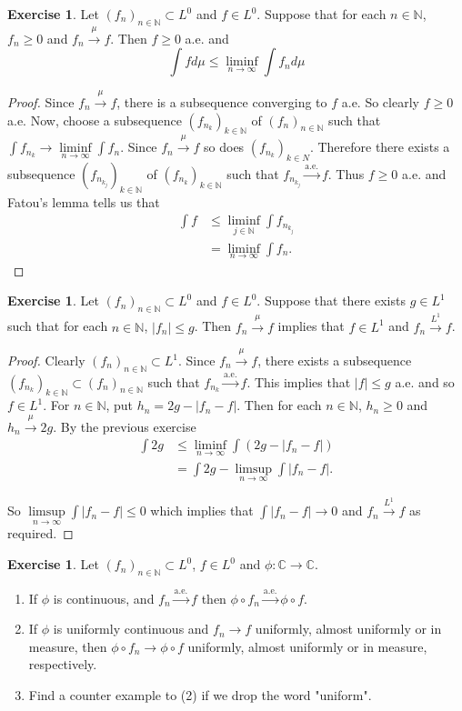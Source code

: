\documentclass[12pt]{amsart}
\theoremstyle{definition}
\newtheorem{ex}[definition]{Exercise}
\newcommand{\C}{\mathbb{C}}
\newcommand{\N}{\mathbb{N}}
\newcommand{\limfn}{\liminf \limits_{n \rightarrow \infty}}
\newcommand{\limpn}{\limsup \limits_{n \rightarrow \infty}}
\newcommand{\convt}[1]{\xrightarrow{\text{#1}}}
\newcommand{\conv}[1]{\xrightarrow{#1}}
\newcommand{\lex}[1]{\label{ex:#1}}
\begin{document}
	\begin{ex} \lex{35008} 
		Let $(f_n)_{n \in \N} \subset L^0$ and $f \in L^0$. Suppose that for each $n \in \N$, $f_n \geq 0$ and $f_n \conv{\mu} f$. Then $f \geq 0$ a.e. and $$\int f d\mu \leq \limfn \int f_n d\mu $$
	\end{ex}
	
	\begin{proof}
		Since $f_n \conv{\mu} f$, there is a subsequence converging to $f$ a.e. So clearly $f \geq 0$ a.e. Now, choose a subsequence $(f_{n_k})_{k \in \N}$ of $(f_n)_{n \in \N}$ such that $\int f_{n_k} \conv{} \limfn \int f_n$. Since $f_n \conv{\mu} f$ so does $(f_{n_k})_{k \in N}$. Therefore there exists a subsequence $(f_{n_{k_j}})_{k \in \N}$ of $(f_{n_k})_{k \in \N}$ such that $f_{n_{k_j}} \convt{a.e.} f$. Thus $f \geq 0 $ a.e. and Fatou's lemma tells us that 
		\begin{align*}
			\int f 
			&\leq \liminf_{j \in \N} \int f_{n_{k_j}}\\
			&= \limfn \int f_n.
		\end{align*}
	\end{proof}
	
	\begin{ex} \lex{35009} 
		Let $(f_n)_{n \in \N} \subset L^0$ and $f \in L^0$. Suppose that there exists $g \in L^1$ such that for each $n \in \N$, $|f_n| \leq g$. Then $f_n \conv{\mu} f$ implies that $f \in L^1$ and $f_n \conv{L^1} f$. 
	\end{ex}
	
	\begin{proof}
		Clearly $(f_n)_{n \in \N} \subset L^1$. Since $f_n \conv{\mu} f$, there exists a subsequence $(f_{n_k})_{k \in \N} \subset (f_n)_{n \in \N}$ such that $f_{n_k} \convt{a.e.} f$. This implies that $|f| \leq g$ a.e. and so $f \in L^1$. For $n \in \N$, put $h_n = 2g - |f_n-f|$. Then for each $n \in \N$, $h_n \geq 0$ and $h_n \conv{\mu}2g$. By the previous exercise 
		\begin{align*}
			\int 2g 
			&\leq \limfn \int (2g - |f_n -f|)\\
			& = \int 2g - \limpn \int|f_n -f|.
		\end{align*}
		
		So $\limpn \int|f_n -f| \leq 0$ which implies that $\int|f_n -f| \rightarrow 0$ and $f_n \conv{L^1} f$ as required. 
	\end{proof}
	
	\begin{ex} \lex{35010} 
		Let $(f_n)_{n \in \N} \subset L^0$, $f \in L^0$ and $\phi :\C \rightarrow \C$. 
		\begin{enumerate}
			\item If $\phi$ is continuous, and $f_n \convt{a.e.} f$ then $\phi \circ f_n \convt{a.e.} \phi \circ f$.
			\item If $\phi$ is uniformly continuous and $f_n \rightarrow f$ uniformly, almost uniformly or in measure, then $\phi \circ f_n \rightarrow \phi \circ f$ uniformly, almost uniformly or in measure, respectively.
			\item Find a counter example to (2) if we drop the word "uniform".
		\end{enumerate} 
	\end{ex}
	
\end{document}
